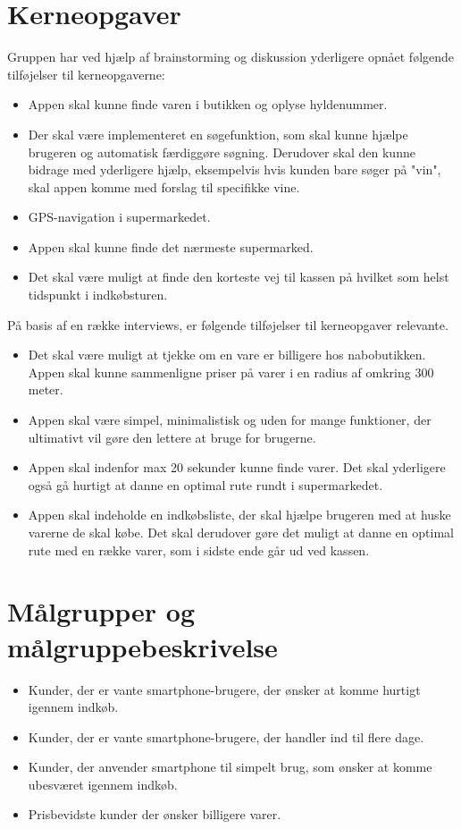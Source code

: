 \documentclass[12pt]{article}
\begin{document}
\newpage

\section{Kerneopgaver}

\noindent Gruppen har ved hjælp af brainstorming og diskussion yderligere opnået følgende tilføjelser til kerneopgaverne:

\begin{itemize}
\item Appen skal kunne finde varen i butikken og oplyse hyldenummer.
\item Der skal være implementeret en søgefunktion, som skal kunne hjælpe brugeren og automatisk færdiggøre søgning. Derudover skal den kunne bidrage med yderligere hjælp, eksempelvis hvis kunden bare søger på "vin", skal appen komme med forslag til specifikke vine.
\item GPS-navigation i supermarkedet.
\item Appen skal kunne finde det nærmeste supermarked.
\item Det skal være muligt at finde den korteste vej til kassen på hvilket som helst tidspunkt i indkøbsturen.
\end{itemize}

\noindent På basis af en række interviews, er følgende tilføjelser til kerneopgaver relevante.

\begin{itemize}
\item Det skal være muligt at tjekke om en vare er billigere hos nabobutikken. Appen skal kunne sammenligne priser på varer i en radius af omkring 300 meter.
\item Appen skal være simpel, minimalistisk og uden for mange funktioner, der ultimativt vil gøre den lettere at bruge for brugerne.
\item Appen skal indenfor max 20 sekunder kunne finde varer. Det skal yderligere også gå hurtigt at danne en optimal rute rundt i supermarkedet.
\item Appen skal indeholde en indkøbsliste, der skal hjælpe brugeren med at huske varerne de skal købe. Det skal derudover gøre det muligt at danne en optimal rute med en række varer, som i sidste ende går ud ved kassen.
\end{itemize}

\section{M\aa lgrupper og m\aa lgruppebeskrivelse}
\begin{itemize}
\item Kunder, der er vante smartphone-brugere, der ønsker at komme hurtigt igennem indkøb.
\item Kunder, der er vante smartphone-brugere, der handler ind til flere dage.
\item Kunder, der anvender smartphone til simpelt brug, som ønsker at komme ubesværet igennem indkøb.
\item Prisbevidste kunder der ønsker billigere varer.
\end{itemize}
\end{document}
